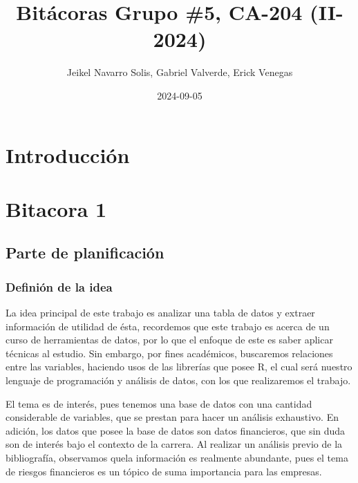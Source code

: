 \documentclass[
  letterpaper,
  DIV=11,
  numbers=noendperiod]{scrreprt}
\title{Bitácoras Grupo \#5, CA-204 (II-2024)}
\author{Jeikel Navarro Solis, Gabriel Valverde, Erick Venegas}
\date{2024-09-05}
\renewcommand*\contentsname{Tabla de contenidos}
\newcommand\contentsname{Tabla de contenidos}
\begin{document}
\maketitle

\renewcommand*\contentsname{Tabla de contenidos}
{
\hypersetup{linkcolor=}
\setcounter{tocdepth}{1}
\tableofcontents
}


\chapter*{Introducción}\label{introducciuxf3n}



\chapter{Bitacora 1}\label{bitacora-1}

\section{Parte de planificación}\label{parte-de-planificaciuxf3n}

\subsection{Definión de la idea}\label{definiuxf3n-de-la-idea}

La idea principal de este trabajo es analizar una tabla de datos y
extraer información de utilidad de ésta, recordemos que este trabajo es
acerca de un curso de herramientas de datos, por lo que el enfoque de
este es saber aplicar técnicas al estudio. Sin embargo, por fines
académicos, buscaremos relaciones entre las variables, haciendo usos de
las librerías que posee R, el cual será nuestro lenguaje de programación
y análisis de datos, con los que realizaremos el trabajo.

El tema es de interés, pues tenemos una base de datos con una cantidad
considerable de variables, que se prestan para hacer un análisis
exhaustivo. En adición, los datos que posee la base de datos son datos
financieros, que sin duda son de interés bajo el contexto de la carrera.
Al realizar un análisis previo de la bibliografía, observamos quela
información es realmente abundante, pues el tema de riesgos financieros
es un tópico de suma importancia para las empresas.
\end{document}
